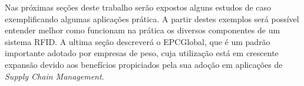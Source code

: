 	Nas próximas seções deste trabalho serão expostos alguns estudos de caso exemplificando algumas aplicações prática. A partir destes exemplos será possível entender melhor como funcionam na prática os diversos componentes de um sistema RFID. A ultima seção descreverá o EPCGlobal, que é um padrão importante adotado por empresas de peso, cuja utilização está em crescente expansão devido aos benefícios propiciados pela sua adoção em aplicações de \textit{Supply Chain Management}.
%	 
%	 
	 


% 